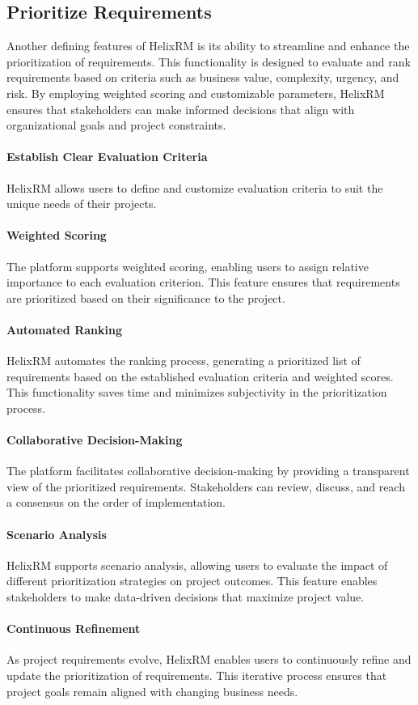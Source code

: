 \subsection{Prioritize Requirements}

Another defining features of HelixRM is its ability to streamline and enhance the prioritization of requirements.
This functionality is designed to evaluate and rank requirements based on criteria such as business value, complexity, urgency, and risk.
By employing weighted scoring and customizable parameters, HelixRM ensures that stakeholders can make informed decisions that align with organizational goals and project constraints.

\paragraph{Establish Clear Evaluation Criteria}
HelixRM allows users to define and customize evaluation criteria to suit the unique needs of their projects.

\paragraph{Weighted Scoring}
The platform supports weighted scoring, enabling users to assign relative importance to each evaluation criterion. This feature ensures that requirements are prioritized based on their significance to the project.

\paragraph{Automated Ranking}
HelixRM automates the ranking process, generating a prioritized list of requirements based on the established evaluation criteria and weighted scores. This functionality saves time and minimizes subjectivity in the prioritization process.

\paragraph{Collaborative Decision-Making}
The platform facilitates collaborative decision-making by providing a transparent view of the prioritized requirements. Stakeholders can review, discuss, and reach a consensus on the order of implementation.

\paragraph{Scenario Analysis}
HelixRM supports scenario analysis, allowing users to evaluate the impact of different prioritization strategies on project outcomes. This feature enables stakeholders to make data-driven decisions that maximize project value.

\paragraph{Continuous Refinement}
As project requirements evolve, HelixRM enables users to continuously refine and update the prioritization of requirements. This iterative process ensures that project goals remain aligned with changing business needs.
